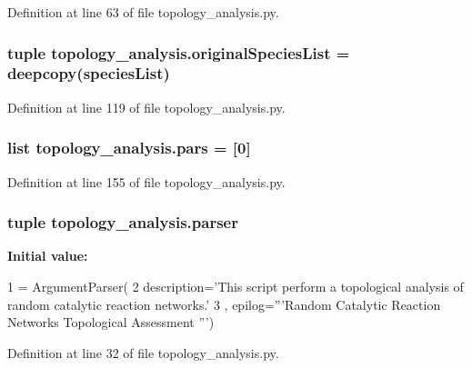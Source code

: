 Definition at line 63 of file topology\+\_\+analysis.\+py.

\hypertarget{a00159_a62b034cfe14eff36f09dd65a51ae7c9c}{
\subsubsection[{original\+Species\+List}]{\setlength{\rightskip}{0pt plus 5cm}tuple topology\+\_\+analysis.\+original\+Species\+List = deepcopy({\bf species\+List})}}\label{a00159_a62b034cfe14eff36f09dd65a51ae7c9c}


Definition at line 119 of file topology\+\_\+analysis.\+py.

\hypertarget{a00159_a516f339905d01b02a4e16181f2fde4be}{
\subsubsection[{pars}]{\setlength{\rightskip}{0pt plus 5cm}list topology\+\_\+analysis.\+pars = \mbox{[}0\mbox{]}}}\label{a00159_a516f339905d01b02a4e16181f2fde4be}


Definition at line 155 of file topology\+\_\+analysis.\+py.

\hypertarget{a00159_aeff833532f5cd31a9720a78cc0f8d97b}{
\subsubsection[{parser}]{\setlength{\rightskip}{0pt plus 5cm}tuple topology\+\_\+analysis.\+parser}}\label{a00159_aeff833532f5cd31a9720a78cc0f8d97b}
{\bfseries Initial value\+:}
\begin{DoxyCode}
1 = ArgumentParser(
2                                 description=\textcolor{stringliteral}{'This script perform a topological analysis of random catalytic
       reaction networks.'}
3                                 , epilog=\textcolor{stringliteral}{'''Random Catalytic Reaction Networks Topological Assessment '''})
\end{DoxyCode}


Definition at line 32 of file topology\+\_\+analysis.\+py.

